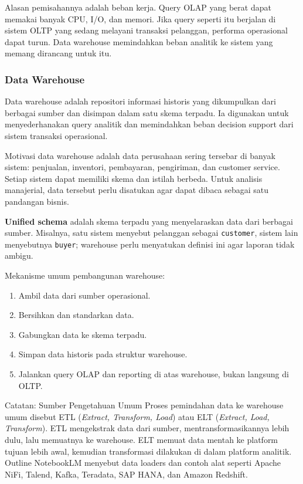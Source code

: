 Alasan pemisahannya adalah beban kerja. Query OLAP yang berat dapat memakai banyak CPU, I/O, dan memori. Jika query seperti itu berjalan di sistem OLTP yang sedang melayani transaksi pelanggan, performa operasional dapat turun. Data warehouse memindahkan beban analitik ke sistem yang memang dirancang untuk itu.

\subsubsection{Data Warehouse}

\begin{jawab}
Data warehouse adalah repositori informasi historis yang dikumpulkan dari berbagai sumber dan disimpan dalam satu skema terpadu. Ia digunakan untuk menyederhanakan query analitik dan memindahkan beban decision support dari sistem transaksi operasional.
\end{jawab}

Motivasi data warehouse adalah data perusahaan sering tersebar di banyak sistem: penjualan, inventori, pembayaran, pengiriman, dan customer service. Setiap sistem dapat memiliki skema dan istilah berbeda. Untuk analisis manajerial, data tersebut perlu disatukan agar dapat dibaca sebagai satu pandangan bisnis.

\textbf{Unified schema} adalah skema terpadu yang menyelaraskan data dari berbagai sumber. Misalnya, satu sistem menyebut pelanggan sebagai \texttt{customer}, sistem lain menyebutnya \texttt{buyer}; warehouse perlu menyatukan definisi ini agar laporan tidak ambigu.

Mekanisme umum pembangunan warehouse:
\begin{enumerate}
    \item Ambil data dari sumber operasional.
    \item Bersihkan dan standarkan data.
    \item Gabungkan data ke skema terpadu.
    \item Simpan data historis pada struktur warehouse.
    \item Jalankan query OLAP dan reporting di atas warehouse, bukan langsung di OLTP.
\end{enumerate}

\begin{cmt}{Catatan: Sumber Pengetahuan Umum}{}
Proses pemindahan data ke warehouse umum disebut ETL (\textit{Extract, Transform, Load}) atau ELT (\textit{Extract, Load, Transform}). ETL mengekstrak data dari sumber, mentransformasikannya lebih dulu, lalu memuatnya ke warehouse. ELT memuat data mentah ke platform tujuan lebih awal, kemudian transformasi dilakukan di dalam platform analitik. Outline NotebookLM menyebut data loaders dan contoh alat seperti Apache NiFi, Talend, Kafka, Teradata, SAP HANA, dan Amazon Redshift.
\end{cmt}

